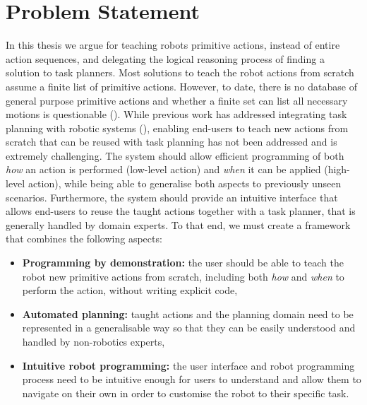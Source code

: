 
\section{Problem Statement}
In this thesis we argue for teaching robots primitive actions, instead of entire action sequences, and delegating the logical reasoning process of finding a solution to task planners.
Most solutions to teach the robot actions from scratch assume a finite list of primitive actions.
However, to date, there is no database of general purpose primitive actions and whether a finite set can list all necessary motions is questionable (\cite{billard2016learning}).
While previous work has addressed integrating task planning with robotic systems (\citet{abdo2013learning,cashmore2015rosplan}), enabling end-users to teach new actions from scratch that can be reused with task planning has not been addressed and is extremely challenging. 
The system should allow efficient programming of both \textit{how} an action is performed (low-level action) and \textit{when} it can be applied (high-level action), while being able to generalise both aspects to previously unseen scenarios. 
Furthermore, the system should provide an intuitive interface that allows end-users to reuse the taught actions together with a task planner, that is generally handled by domain experts.
To that end, we must create a framework that combines the following aspects:
\begin{itemize}
	\item \textbf{Programming by demonstration:} the user should be able to teach the robot new primitive actions from scratch, including both \textit{how} and \textit{when} to perform the action, without writing explicit code,
	\item \textbf{Automated planning:} taught actions and the planning domain need to be represented in a generalisable way so that they can be easily understood and handled by non-robotics experts,
	\item \textbf{Intuitive robot programming:} the user interface and robot programming process need to be intuitive enough for users to understand and allow them to navigate on their own in order to customise the robot to their specific task.
\end{itemize}

